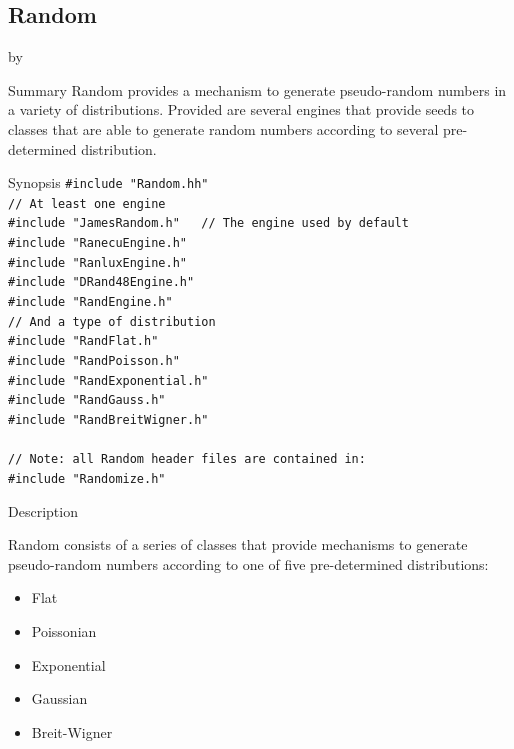 \documentclass[twoside]{article}
\newcommand{\entrylabel}[1]{\mbox{\textbf{{#1}}}\hfil}%
\newenvironment{entry}
{\begin{list}{}%
    {\renewcommand{\makelabel}{\entrylabel}%
     \setlength{\labelwidth}{90pt}%
     \setlength{\leftmargin}{\labelwidth}
     \advance\leftmargin by \labelsep%
      }%
    }%
  {\end{list}}
\newcommand{\Entrylabel}[1]%
{\raisebox{0pt}[1ex][0pt]{\makebox[\labelwidth][l]%
    {\parbox[t]{\labelwidth}{\hspace{0pt}\textbf{{#1}}}}}}
\newenvironment{Entry}%
{\renewcommand{\entrylabel}{\Entrylabel}\begin{entry}}%
  {\end{entry}}
\begin{document}
\clearpage

%
%
\subsection{Random } \label{Random}
\begin{Entry}
\item[Summary]
    Random provides a mechanism to generate pseudo-random numbers in
    a variety of distributions.  Provided are several engines
    that provide seeds to classes that are able to generate random
    numbers according to several pre-determined distribution.
    
\item[Synopsis]
    \verb+#include "Random.hh"+\\
    \verb+// At least one engine+\\
    \verb+#include "JamesRandom.h"   // The engine used by default+\\
    \verb+#include "RanecuEngine.h"+\\
    \verb+#include "RanluxEngine.h"+\\
    \verb+#include "DRand48Engine.h"+\\
    \verb+#include "RandEngine.h"+\\
    \verb+// And a type of distribution+\\
    \verb+#include "RandFlat.h"+\\
    \verb+#include "RandPoisson.h"+\\
    \verb+#include "RandExponential.h"+\\
    \verb+#include "RandGauss.h"+\\
    \verb+#include "RandBreitWigner.h"+\\ \\
    \verb+// Note: all Random header files are contained in:+\\
    \verb+#include "Randomize.h"+\\
    
\item[Description]   

  Random consists of a series of classes that provide mechanisms to
  generate pseudo-random numbers according to one of five pre-determined
  distributions:
  \begin{itemize}
   \item Flat
   \item Poissonian
   \item Exponential
   \item Gaussian
   \item Breit-Wigner
  \end{itemize}


\end{Entry}
\end{document}
